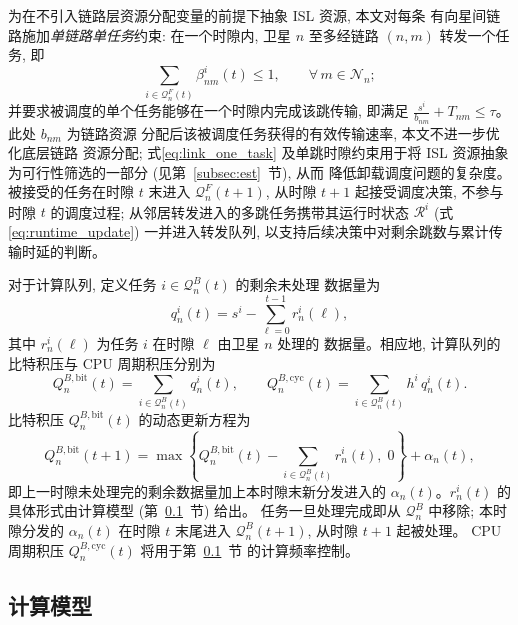 \documentclass[a4paper,11pt]{article}
\begin{document}
为在不引入链路层资源分配变量的前提下抽象 ISL 资源, 本文对每条
有向星间链路施加\emph{单链路单任务}约束: 在一个时隙内, 卫星 $n$
至多经链路 $(n,m)$ 转发一个任务, 即
\begin{equation}
    \sum_{i \in \mathcal{Q}^F_n(t)} \beta^i_{nm}(t) \le 1,
    \qquad \forall\, m \in \mathcal{N}_n;
    \label{eq:link_one_task}
\end{equation}
并要求被调度的单个任务能够在一个时隙内完成该跳传输, 即满足
$\frac{s^i}{b_{nm}} + T_{nm} \le \tau$。此处 $b_{nm}$ 为链路资源
分配后该被调度任务获得的有效传输速率, 本文不进一步优化底层链路
资源分配; 式\eqref{eq:link_one_task} 及单跳时隙约束用于将 ISL
资源抽象为可行性筛选的一部分 (见第~\ref{subsec:est}~节), 从而
降低卸载调度问题的复杂度。被接受的任务在时隙 $t$ 末进入
$\mathcal{Q}^F_n(t+1)$, 从时隙 $t+1$ 起接受调度决策, 不参与时隙
$t$ 的调度过程; 从邻居转发进入的多跳任务携带其运行时状态
$\mathcal{R}^i$ (式\eqref{eq:runtime_update}) 一并进入转发队列,
以支持后续决策中对剩余跳数与累计传输时延的判断。

对于计算队列, 定义任务 $i \in \mathcal{Q}^B_n(t)$ 的剩余未处理
数据量为
\begin{equation}
    q^i_n(t) = s^i - \sum_{\ell = 0}^{t-1} r^i_n(\ell),
    \label{eq:remaining_data}
\end{equation}
其中 $r^i_n(\ell)$ 为任务 $i$ 在时隙 $\ell$ 由卫星 $n$ 处理的
数据量。相应地, 计算队列的比特积压与 CPU 周期积压分别为
\begin{equation}
    Q^{B,\mathrm{bit}}_n(t) = \sum_{i \in \mathcal{Q}^B_n(t)} q^i_n(t),
    \qquad
    Q^{B,\mathrm{cyc}}_n(t) = \sum_{i \in \mathcal{Q}^B_n(t)} h^i\, q^i_n(t).
    \label{eq:QB_backlog}
\end{equation}
比特积压 $Q^{B,\mathrm{bit}}_n(t)$ 的动态更新方程为
\begin{equation}
    Q^{B,\mathrm{bit}}_n(t+1) =
    \max\!\left\{Q^{B,\mathrm{bit}}_n(t)
    - \sum_{i \in \mathcal{Q}^B_n(t)} r^i_n(t),\; 0\right\}
    + \alpha_n(t),
    \label{eq:QB_update}
\end{equation}
即上一时隙未处理完的剩余数据量加上本时隙末新分发进入的
$\alpha_n(t)$。$r^i_n(t)$ 的具体形式由计算模型
(第~\ref{subsec:computation}~节) 给出。
任务一旦处理完成即从 $\mathcal{Q}^B_n$ 中移除;
本时隙分发的 $\alpha_n(t)$ 在时隙 $t$ 末尾进入
$\mathcal{Q}^B_n(t+1)$, 从时隙 $t+1$ 起被处理。
CPU 周期积压 $Q^{B,\mathrm{cyc}}_n(t)$ 将用于第~\ref{subsec:computation}~节
的计算频率控制。


\subsection{计算模型}
\label{subsec:computation}
\end{document}
